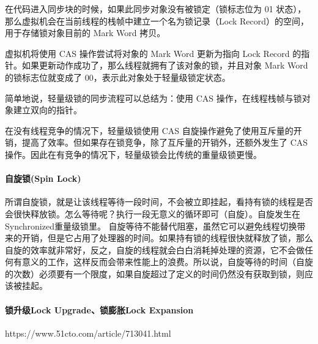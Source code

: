 \documentclass[../../../interview-questions.tex]{subfiles}
\begin{document}
在代码进入同步块的时候，如果此同步对象没有被锁定（锁标志位为 01 状态），那么虚拟机会在当前线程的栈帧中建立一个名为锁记录（Lock Record）的空间，用于存储锁对象目前的 Mark Word 拷贝。

虚拟机将使用 CAS 操作尝试将对象的 Mark Word 更新为指向 Lock Record 的指针。如果更新动作成功了，那么线程就拥有了该对象的锁，并且对象 Mark Word 的锁标志位就变成了 00，表示此对象处于轻量级锁定状态。

简单地说，轻量级锁的同步流程可以总结为：使用 CAS 操作，在线程栈帧与锁对象建立双向的指针。

在没有线程竞争的情况下，轻量级锁使用 CAS 自旋操作避免了使用互斥量的开销，提高了效率。但如果存在锁竞争，除了互斥量的开销外，还额外发生了 CAS 操作。因此在有竞争的情况下，轻量级锁会比传统的重量级锁更慢。

\paragraph{自旋锁(Spin Lock)}所谓自旋锁，就是让该线程等待一段时间，不会被立即挂起，看持有锁的线程是否会很快释放锁。怎么等待呢？执行一段无意义的循环即可（自旋）。自旋发生在Synchronized重量级锁里。
自旋等待不能替代阻塞，虽然它可以避免线程切换带来的开销，但是它占用了处理器的时间。如果持有锁的线程很快就释放了锁，那么自旋的效率就非常好，反之，自旋的线程就会白白消耗掉处理的资源，它不会做任何有意义的工作，这样反而会带来性能上的浪费。所以说，自旋等待的时间（自旋的次数）必须要有一个限度，如果自旋超过了定义的时间仍然没有获取到锁，则应该被挂起。

\paragraph{锁升级Lock Upgrade、锁膨胀Lock Expansion}

https://www.51cto.com/article/713041.html
\end{document}
